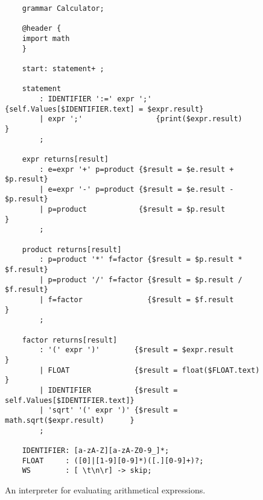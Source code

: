 \begin{figure}[!ht]
\centering
\begin{verbatim}
    grammar Calculator;
    
    @header {
    import math
    }
    
    start: statement+ ; 
    
    statement
        : IDENTIFIER ':=' expr ';' {self.Values[$IDENTIFIER.text] = $expr.result}
        | expr ';'                 {print($expr.result)                         }
        ;
    
    expr returns[result]
        : e=expr '+' p=product {$result = $e.result + $p.result}
        | e=expr '-' p=product {$result = $e.result - $p.result}
        | p=product            {$result = $p.result            }
        ;
    
    product returns[result]
        : p=product '*' f=factor {$result = $p.result * $f.result}
        | p=product '/' f=factor {$result = $p.result / $f.result}
        | f=factor               {$result = $f.result            }
        ;
    
    factor returns[result]
        : '(' expr ')'        {$result = $expr.result                 }
        | FLOAT               {$result = float($FLOAT.text)           }
        | IDENTIFIER          {$result = self.Values[$IDENTIFIER.text]}
        | 'sqrt' '(' expr ')' {$result = math.sqrt($expr.result)      }
        ;
    
    IDENTIFIER: [a-zA-Z][a-zA-Z0-9_]*;
    FLOAT     : ([0]|[1-9][0-9]*)([.][0-9]+)?;
    WS        : [ \t\n\r] -> skip; 
\end{verbatim}
\vspace*{-0.3cm}
\caption{An interpreter for evaluating arithmetical expressions.}
\label{fig:Calculator.g4}
\end{figure}

